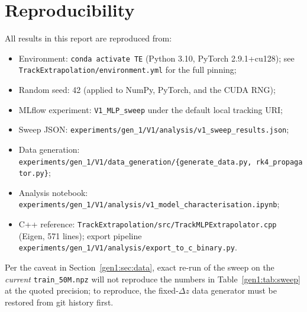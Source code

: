 \documentclass[a4paper,11pt]{article}
\newcommand{\dz}{\Delta z}
\begin{document}
\section{Reproducibility}\label{gen1:sec:reproducibility}

All results in this report are reproduced from:
\begin{itemize}\setlength{\itemsep}{1pt}
\item Environment: \texttt{conda activate TE} (Python 3.10, PyTorch
  2.9.1+cu128); see \texttt{TrackExtrapolation/environment.yml} for the
  full pinning;
\item Random seed: 42 (applied to NumPy, PyTorch, and the CUDA RNG);
\item MLflow experiment: \texttt{V1\_MLP\_sweep} under the default
  local tracking URI;
\item Sweep JSON: \texttt{experiments/gen\_1/V1/analysis/v1\_sweep\_results.json};
\item Data generation: \texttt{experiments/gen\_1/V1/data\_generation/\{generate\_data.py,\ rk4\_propagator.py\}};
\item Analysis notebook:
  \texttt{experiments/gen\_1/V1/analysis/v1\_model\_characterisation.ipynb};
\item C++ reference:
  \texttt{TrackExtrapolation/src/TrackMLPExtrapolator.cpp} (Eigen,
  571 lines); export pipeline
  \texttt{experiments/gen\_1/V1/analysis/export\_to\_c\_binary.py}.
\end{itemize}
Per the caveat in Section~\ref{gen1:sec:data}, exact re-run of the sweep on
the \emph{current} \texttt{train\_50M.npz} will not reproduce the
numbers in Table~\ref{gen1:tab:sweep} at the quoted precision; to
reproduce, the fixed-$\dz$ data generator must be restored from git
history first.
\end{document}
